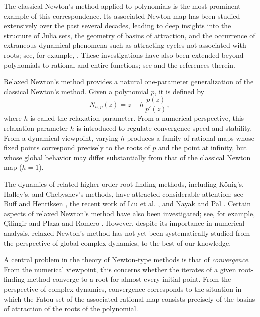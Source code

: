 \documentclass[12pt]{article}
\numberwithin{equation}{section}
\begin{document}
The classical Newton's method applied to polynomials is the most prominent example of this correspondence. Its associated Newton map has been studied extensively over the past several decades, leading to deep insights into the structure of Julia sets, the geometry of basins of attraction, and the occurrence of extraneous dynamical phenomena such as attracting cycles not associated with roots; see, for example, \cite{HSS2003,Lei1997,Felex1989}. These investigations have also been extended beyond polynomials to rational and entire functions; see \cite{BFJK2018,NPP2026,RS2007} and the references therein.

Relaxed Newton's method provides a natural one-parameter generalization of the classical Newton's method. Given a polynomial $p$, it is defined by
\begin{equation}\label{Formula_ReNew}
N_{h,p}(z)=z-h\,\frac{p(z)}{p'(z)},
\end{equation}
where $h$ is called the relaxation parameter. From a numerical perspective, this relaxation parameter $h$ is introduced to regulate convergence speed and stability. From a dynamical viewpoint, varying $h$ produces a family of rational maps whose fixed points correspond precisely to the roots of $p$ and the point at infinity, but whose global behavior may differ substantially from that of the classical Newton map ($h=1$).

The dynamics of related higher-order root-finding methods, including K\"onig's, Halley's, and Chebyshev's methods, have attracted considerable attention; see Buff and Henriksen \cite{BH2003}, the recent work of Liu et al. \cite{LPP2026}, and Nayak and Pal \cite{Sym_dyn}. Certain aspects of relaxed Newton's method have also been investigated; see, for example, \c{C}ilingir \cite{Cilingir2006} and Plaza and Romero \cite{PlazaRomero2011}. However, despite its importance in numerical analysis, relaxed Newton's method has not yet been systematically studied from the perspective of global complex dynamics, to the best of our knowledge.

A central problem in the theory of Newton-type methods is that of \emph{convergence}. From the numerical viewpoint, this concerns whether the iterates of a given root-finding method converge to a root for almost every initial point. From the perspective of complex dynamics, convergence corresponds to the situation in which the Fatou set of the associated rational map consists precisely of the basins of attraction of the roots of the polynomial.
\end{document}
